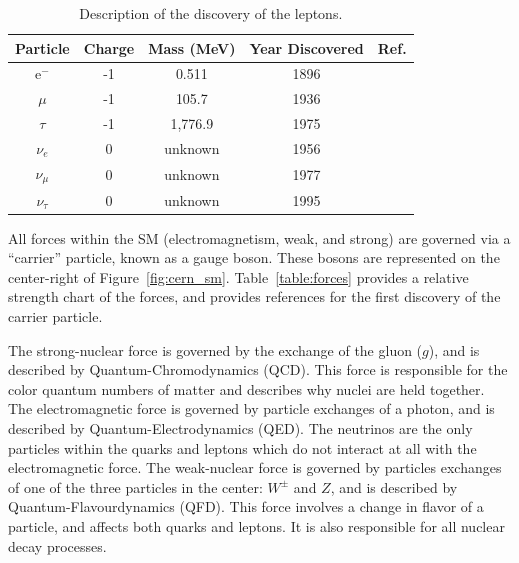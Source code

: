 \begin{table}
\begin{center}
\begin{tabular}{||c c c c c||}
 \hline
 Particle & Charge & Mass (MeV) & Year Discovered & Ref.\\ [0.5ex]
 \hline\hline
 e$^{-}$ & -1 & 0.511 & 1896 & \citep{doi:10.1080/14786449708621070} \\
 \hline
 $\mu$ & -1 & 105.7 & 1936 & \citep{muon_discovery_PhysRev.51.884} \\
 \hline
 $\tau$ & -1 & 1,776.9 & 1975 & \citep{tau_discovery_PhysRevLett.35.1489} \\
 \hline
 $\nu_{e}$ & 0 & unknown & 1956 & \citep{first_neutrino_measurement} \\
 \hline
 $\nu_{\mu}$ & 0 & unknown & 1977 & \citep{PhysRevLett.9.36} \\
 \hline
 $\nu_{\tau}$ & 0 & unknown & 1995 & \citep{tau_neutrino_discovery_KODAMA2001218} \\
 \hline
\end{tabular}
\caption{Description of the discovery of the leptons.
}
\label{table:lepton}
\end{center}
\end{table}

All forces within the SM (electromagnetism, weak, and strong) are governed via a ``carrier'' particle, known as a gauge boson.
These bosons are represented on the center-right of Figure~\ref{fig:cern_sm}.
Table~\ref{table:forces} provides a relative strength chart of the forces, and provides references for the first discovery of the carrier particle.

The strong-nuclear force is governed by the exchange of the gluon ($g$), and is described by Quantum-Chromodynamics (QCD).
This force is responsible for the color quantum numbers of matter and describes why nuclei are held together.
The electromagnetic force is governed by particle exchanges of a photon, and is described by Quantum-Electrodynamics (QED).
The neutrinos are the only particles within the quarks and leptons which do not interact at all with the electromagnetic force.
The weak-nuclear force is governed by particles exchanges of one of the three particles in the center: $W^{\pm}$ and $Z$, and is described by Quantum-Flavourdynamics (QFD).
This force involves a change in flavor of a particle, and affects both quarks and leptons.
It is also responsible for all nuclear decay processes.

